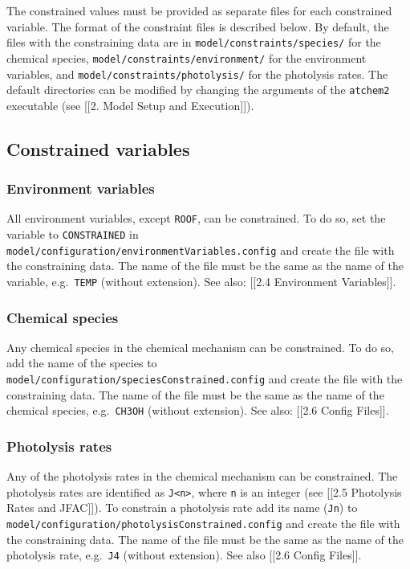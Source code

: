 The constrained values must be provided as separate files for each
constrained variable. The format of the constraint files is described
below. By default, the files with the constraining data are in
\texttt{model/constraints/species/} for the chemical species,
\texttt{model/constraints/environment/} for the environment variables,
and \texttt{model/constraints/photolysis/} for the photolysis rates. The
default directories can be modified by changing the arguments of the
\texttt{atchem2} executable (see {[}{[}2. Model Setup and
Execution{]}{]}).

\subsection{Constrained variables} \label{constrained-variables}

\subsubsection{Environment variables} \label{environment-variables}

All environment variables, except \texttt{ROOF}, can be constrained. To
do so, set the variable to \texttt{CONSTRAINED} in
\texttt{model/configuration/environmentVariables.config} and create the
file with the constraining data. The name of the file must be the same
as the name of the variable, e.g.~\texttt{TEMP} (without extension). See
also: {[}{[}2.4 Environment Variables{]}{]}.

\subsubsection{Chemical species} \label{chemical-species}

Any chemical species in the chemical mechanism can be constrained. To do
so, add the name of the species to
\texttt{model/configuration/speciesConstrained.config} and create the
file with the constraining data. The name of the file must be the same
as the name of the chemical species, e.g.~\texttt{CH3OH} (without
extension). See also: {[}{[}2.6 Config Files{]}{]}.

\subsubsection{Photolysis rates} \label{photolysis-rates}

Any of the photolysis rates in the chemical mechanism can be
constrained. The photolysis rates are identified as
\texttt{J\textless{}n\textgreater{}}, where \texttt{n} is an integer
(see {[}{[}2.5 Photolysis Rates and JFAC{]}{]}). To constrain a
photolysis rate add its name (\texttt{Jn}) to
\texttt{model/configuration/photolysisConstrained.config} and create the
file with the constraining data. The name of the file must be the same
as the name of the photolysis rate, e.g.~\texttt{J4} (without
extension). See also {[}{[}2.6 Config Files{]}{]}.

